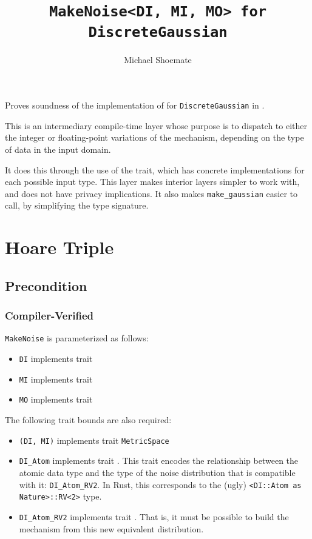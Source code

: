 \documentclass{article}
\title{\texttt{MakeNoise<DI, MI, MO> for DiscreteGaussian}}
\author{Michael Shoemate}
\date{}
\begin{document}
\maketitle

\contrib
Proves soundness of the implementation of  
for \texttt{DiscreteGaussian} in .

This is an intermediary compile-time layer whose purpose is 
to dispatch to either the integer or floating-point variations of the mechanism,
depending on the type of data in the input domain.

It does this through the use of the  trait,
which has concrete implementations for each possible input type.
This layer makes interior layers simpler to work with, and does not have privacy implications.
It also makes \texttt{make\_gaussian} easier to call,
by simplifying the type signature.

\section{Hoare Triple}
\subsection*{Precondition}
\subsubsection*{Compiler-Verified}
\texttt{MakeNoise} is parameterized as follows:
\begin{itemize}
    \item \texttt{DI} implements trait 
    \item \texttt{MI} implements trait 
    \item \texttt{MO} implements trait 
\end{itemize}

The following trait bounds are also required:
\begin{itemize}
    \item \texttt{(DI, MI)} implements trait \texttt{MetricSpace}
    \item \texttt{DI\_Atom} implements trait .
        This trait encodes the relationship between the atomic data type 
        and the type of the noise distribution that is compatible with it: \texttt{DI\_Atom\_RV2}.
        In Rust, this corresponds to the (ugly) \texttt{<DI::Atom as Nature>::RV<2>} type.
    \item \texttt{DI\_Atom\_RV2} implements trait .
        That is, it must be possible to build the mechanism from this new equivalent distribution.
\end{itemize}
\end{document}
